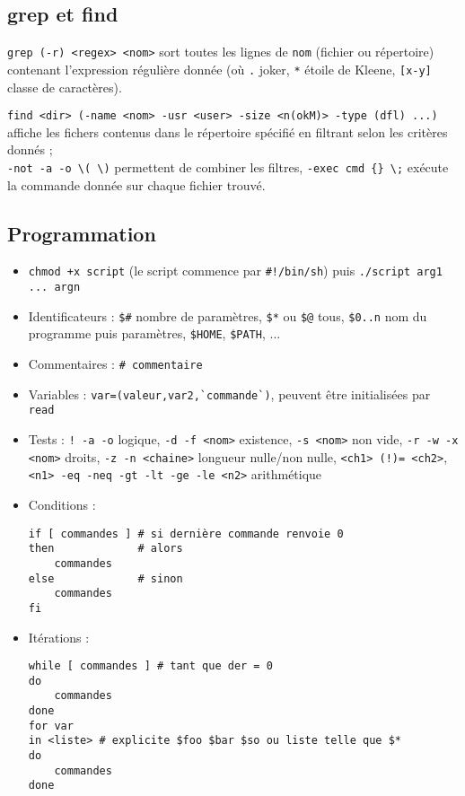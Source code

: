 \documentclass[a4paper]{article}
\begin{document}
\subsection{grep et find}

\verb?grep (-r) <regex> <nom>? sort toutes les lignes de \verb?nom? (fichier ou répertoire) contenant l'expression régulière donnée (où \verb?.? joker, \verb?*? étoile de Kleene, \verb?[x-y]? classe de caractères).

\verb?find <dir> (-name <nom> -usr <user> -size <n(okM)> -type (dfl) ...)? affiche les fichers contenus dans le répertoire spécifié en filtrant selon les critères donnés ;\\ \verb?-not -a -o \( \)? permettent de combiner les filtres, \verb?-exec cmd {} \;? exécute la commande donnée sur chaque fichier trouvé.

\subsection{Programmation}

\begin{itemize}
	\item \verb?chmod +x script? (le script commence par \verb?#!/bin/sh?) puis \verb?./script arg1 ... argn?
	\item Identificateurs : \verb?$#? nombre de paramètres, \verb?$*? ou \verb?$@? tous, \verb?$0..n? nom du programme puis paramètres, \verb?$HOME?, \verb?$PATH?, ...
	\item Commentaires : \verb?# commentaire?
	\item Variables : \verb?var=(valeur,var2,`commande`)?, peuvent être initialisées par \verb?read?
	\item Tests : \verb?! -a -o? logique, \verb?-d -f <nom>? existence, \verb?-s <nom>? non vide, \verb?-r -w -x <nom>? droits, \verb?-z -n <chaine>? longueur nulle/non nulle, \verb?<ch1> (!)= <ch2>?,\\ \verb;<n1> -eq -neq -gt -lt -ge -le <n2>; arithmétique
	\item Conditions : \begin{verbatim}
if [ commandes ] # si dernière commande renvoie 0
then             # alors
    commandes
else             # sinon
    commandes
fi
	\end{verbatim}
	\item Itérations : \begin{verbatim}
while [ commandes ] # tant que der = 0
do
    commandes
done
for var
in <liste> # explicite $foo $bar $so ou liste telle que $*
do
    commandes
done
	\end{verbatim}
\end{itemize}
\end{document}
